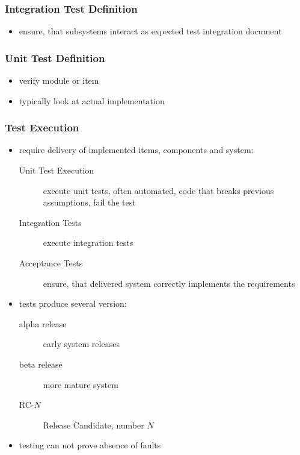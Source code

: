 \documentclass[a4paper, 10pt]{article}
\begin{document}
\subsubsection*{Integration Test Definition}
\begin{itemize}
    \item ensure, that subsystems interact as expected \follows test integration document
\end{itemize}

\subsubsection*{Unit Test Definition}
\begin{itemize}
    \item verify module or item
    \item typically look at actual implementation
\end{itemize}

\subsubsection*{Test Execution}
\begin{itemize}
    \item require delivery of implemented items, components and system:
    \begin{description}
        \item[Unit Test Execution] execute unit tests, often automated, code that breaks previous assumptions, fail the test
        \item[Integration Tests] execute integration tests
        \item[Acceptance Tests] ensure, that delivered system correctly implements the requirements
    \end{description}
    \item tests produce several version:
    \begin{description}
        \item[alpha release] early system releases
        \item[beta release] more mature system
        \item[RC-$N$] Release Candidate, number $N$
    \end{description}
    \item testing can not prove absence of faults
\end{itemize}
\end{document}
